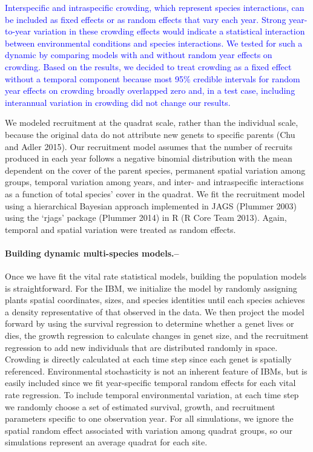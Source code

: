 \documentclass[11pt,]{article}
\begin{document}
\textcolor{blue}{Interspecific and intraspecific crowding, which represent species interactions, can be included as fixed effects or as random effects that vary each year.
Strong year-to-year variation in these crowding effects would indicate a statistical interaction between environmental conditions and species interactions.
We tested for such a dynamic by comparing models with and without random year effects on crowding.
Based on the results, we decided to treat crowding as a fixed effect without a temporal component because most 95\% credible intervals for random year effects on crowding broadly overlapped zero and, in a test case, including interannual variation in crowding did not change our results.}

We modeled recruitment at the quadrat scale, rather than the individual
scale, because the original data do not attribute new genets to specific
parents (Chu and Adler 2015). Our recruitment model assumes that the
number of recruits produced in each year follows a negative binomial
distribution with the mean dependent on the cover of the parent species,
permanent spatial variation among groups, temporal variation among
years, and inter- and intraspecific interactions as a function of total
species' cover in the quadrat. We fit the recruitment model using a
hierarchical Bayesian approach implemented in JAGS (Plummer 2003) using
the `rjags' package (Plummer 2014) in R (R Core Team 2013). Again,
temporal and spatial variation were treated as random effects.

\paragraph{Building dynamic multi-species
models.--}\label{building-dynamic-multi-species-models.}

Once we have fit the vital rate statistical models, building the
population models is straightforward. For the IBM, we initialize the
model by randomly assigning plants spatial coordinates, sizes, and
species identities until each species achieves a density representative
of that observed in the data. We then project the model forward by using
the survival regression to determine whether a genet lives or dies, the
growth regression to calculate changes in genet size, and the
recruitment regression to add new individuals that are distributed
randomly in space. Crowding is directly calculated at each time step
since each genet is spatially referenced. Environmental stochasticity is
not an inherent feature of IBMs, but is easily included since we fit
year-specific temporal random effects for each vital rate regression. To
include temporal environmental variation, at each time step we randomly
choose a set of estimated survival, growth, and recruitment parameters
specific to one observation year. For all simulations, we ignore the
spatial random effect associated with variation among quadrat groups, so
our simulations represent an average quadrat for each site.
\end{document}
